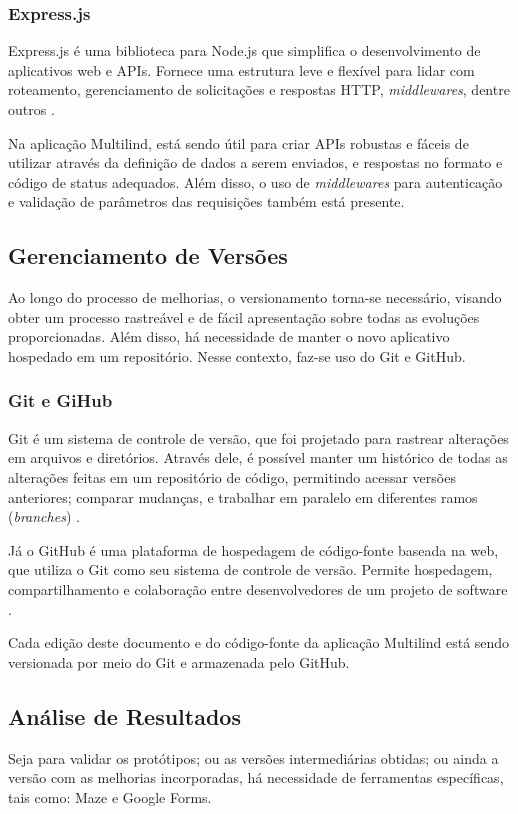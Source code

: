 \subsubsection{Express.js}
\label{sec:Express.js}
Express.js é uma biblioteca para Node.js que simplifica o desenvolvimento de aplicativos web e APIs. Fornece uma estrutura leve e flexível para 
lidar com roteamento, gerenciamento de solicitações e respostas HTTP, \textit{middlewares}, dentre outros \cite{expressjs}.

Na aplicação Multilind, está sendo útil para criar APIs robustas e fáceis de utilizar através da definição de dados a serem enviados, e respostas 
no formato e código de status adequados. Além disso, o uso de \textit{middlewares} para autenticação e validação de parâmetros das requisições também está presente.

\subsection{Gerenciamento de Versões}
\label{sec:Gerenciamento de Versoes}
Ao longo do processo de melhorias, o versionamento torna-se necessário, visando obter um processo rastreável e de fácil apresentação sobre todas as evoluções 
proporcionadas. Além disso, há necessidade de manter o novo aplicativo hospedado em um repositório. Nesse contexto, faz-se uso do Git e GitHub.

\subsubsection{Git e GiHub}
\label{sec:Git e GiHub}
Git é um sistema de controle de versão, que foi projetado para rastrear alterações em arquivos e diretórios. Através dele, é 
possível manter um histórico de todas as alterações feitas em um repositório de código, permitindo acessar versões anteriores; 
comparar mudanças, e trabalhar em paralelo em diferentes ramos (\textit{branches}) \cite{git}.

Já o GitHub é uma plataforma de hospedagem de código-fonte baseada na web, que utiliza o Git como seu sistema de controle de 
versão. Permite hospedagem, compartilhamento e colaboração entre desenvolvedores de um projeto de software \cite{github}.

Cada edição deste documento e do código-fonte da aplicação Multilind está sendo versionada por meio do Git e armazenada pelo GitHub. 

\subsection{Análise de Resultados}
\label{sec:Análise de Resultados}
Seja para validar os protótipos; ou as versões intermediárias obtidas; ou ainda a versão com as melhorias incorporadas, há necessidade de ferramentas específicas, 
tais como: Maze e Google Forms.

